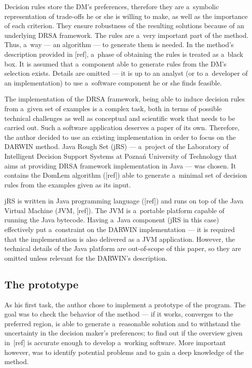 Decision rules store the DM's preferences, therefore they are a~symbolic
representation of trade-offs he or she is willing to make, as well as the
importance of each criterion. They ensure robustness of the resulting
solutions because of an underlying DRSA framework. The rules are a~very
important part of the method. Thus, a~way --- an algorithm --- to generate
them is needed. In the method's description provided in [ref], a~phase of
obtaining the rules is treated as a~black box. It is assumed that a~component
able to generate rules from the DM's selection exists. Details are omitted ---
it is up to an analyst (or to a~developer of an implementation) to use
a~software component he or she finds feasible.

The implementation of the DRSA framework, being able to induce decision rules
from a~given set of examples is a complex task, both in terms of possible
technical challenges as well as conceptual and scientific work that needs to
be carried out. Such a software application deserves a paper of its
own. Therefore, the author decided to use an existing implementation in order
to focus on the DARWIN method. Java Rough Set (jRS) --- a~project of the
Laboratory of Intelligent Decision Support Systems at Poznań University of
Technology that aims at providing DRSA framework implementation in Java ---
was chosen. It contains the DomLem algorithm ([ref]) able to generate
a~minimal set of decision rules from the examples given as its input.

jRS is written in Java programming language ([ref]) and runs on top of the
Java Virtual Machine (JVM, [ref]). The JVM is a~portable platform capable of
running the Java bytecode. Having a~Java component (jRS in this case)
effectively put a~constraint on the DARWIN implementation --- it is required
that the implementation is also delivered as a JVM application. However, the
technical details of the Java platform are out-of-scope of this paper, so they
are omitted unless relevant for the DARWIN's description.

\subsection{The prototype}

As his first task, the author chose to implement a prototype of the
program. The goal was to check the behavior of the method --- if it works,
converges to the preferred region, is able to generate a~reasonable solution
and to withstand the uncertainty in the decision maker's preferences; to find
out if the overview given in~[ref] is accurate enough to develop a~working
software. More important however, was to identify potential problems and to
gain a deep knowledge of the method.

